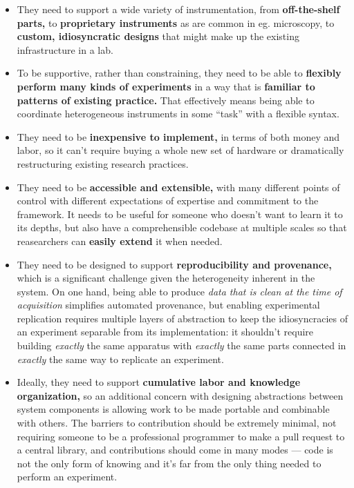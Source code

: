 \documentclass[10pt]{article}
\begin{document}
\begin{multicols}{2}
\begin{itemize}
\item
  They need to support a wide variety of instrumentation, from
  \textbf{off-the-shelf parts,} to \textbf{proprietary instruments} as
  are common in eg. microscopy, to \textbf{custom, idiosyncratic
  designs} that might make up the existing infrastructure in a lab.
\item
  To be supportive, rather than constraining, they need to be able to
  \textbf{flexibly perform many kinds of experiments} in a way that is
  \textbf{familiar to patterns of existing practice.} That effectively
  means being able to coordinate heterogeneous instruments in some
  ``task'' with a flexible syntax.
\item
  They need to be \textbf{inexpensive to implement,} in terms of both
  money and labor, so it can't require buying a whole new set of
  hardware or dramatically restructuring existing research practices.
\item
  They need to be \textbf{accessible and extensible,} with many
  different points of control with different expectations of expertise
  and commitment to the framework. It needs to be useful for someone who
  doesn't want to learn it to its depths, but also have a comprehensible
  codebase at multiple scales so that reasearchers can \textbf{easily
  extend} it when needed.
\item
  They need to be designed to support \textbf{reproducibility and
  provenance,} which is a significant challenge given the heterogeneity
  inherent in the system. On one hand, being able to produce \emph{data
  that is clean at the time of acquisition} simplifies automated
  provenance, but enabling experimental replication requires multiple
  layers of abstraction to keep the idiosyncracies of an experiment
  separable from its implementation: it shouldn't require building
  \emph{exactly} the same apparatus with \emph{exactly} the same parts
  connected in \emph{exactly} the same way to replicate an experiment.
\item
  Ideally, they need to support \textbf{cumulative labor and knowledge
  organization,} so an additional concern with designing abstractions
  between system components is allowing work to be made portable and
  combinable with others. The barriers to contribution should be
  extremely minimal, not requiring someone to be a professional
  programmer to make a pull request to a central library, and
  contributions should come in many modes --- code is not the only form
  of knowing and it's far from the only thing needed to perform an
  experiment.
\end{itemize}


\end{multicols}
\end{document}
